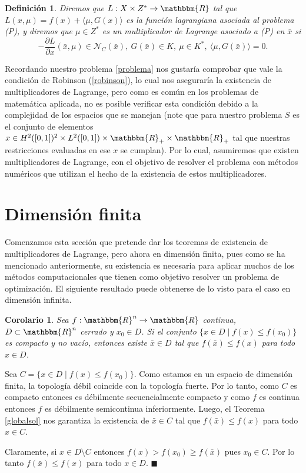 \documentclass[a4paper,10pt]{book}
\newcommand{\R}{\mathbbm{R}}
\newcommand{\arr}{\rightarrow}
\newcommand{\bx}{\bar{x}}
\newcommand{\cN}{\mathcal{N}}
\newtheorem{cor}[teo]{Corolario}
\newtheorem{defi}[teo]{Definici\'on}
\newenvironment{dem}{\vspace*{-0.1cm}{\it Demostraci\'on:}}{\hfill
$\blacksquare$\\}
\begin{document}
\begin{defi}
 Diremos que $L:X\times Z^*\arr \R$ tal que $L(x,\mu)= f(x)+\langle\mu , G(x)\rangle$ es la función lagrangiana asociada al problema (P), y diremos que $\mu\in Z^*$ es un multiplicador de Lagrange asociado a (P) en $\bx$ si 
 $$-\frac{\partial L}{\partial x}(\bx,\mu)\in\cN_C(\bx),\ G(\bx)\in K,\ \mu\in K^* ,\  \langle\mu , G(\bx)\rangle=0.$$ 
\end{defi}

Recordando nuestro problema \eqref{problema} nos gustaría comprobar que vale la condición de Robinson (\ref{robinson}), lo cual nos aseguraría la existencia de multiplicadores de Lagrange, pero como es común en los problemas de matemática aplicada, no es posible verificar esta condición debido a la complejidad de los espacios que se manejan (note que para nuestro problema $S$ es el conjunto de elementos $x\in H^2([0,1])^2 \times L^2([0,1])\times \R_+\times \R_+$ tal que nuestras restricciones evaluadas en ese $x$ se cumplan). Por lo cual, asumiremos que existen multiplicadores de Lagrange, con el objetivo de resolver el problema con métodos numéricos que utilizan el hecho de la existencia de estos multiplicadores.

\section{Dimensión finita}

Comenzamos esta sección que pretende dar los teoremas de existencia de multiplicadores de Lagrange, pero ahora en dimensión finita, pues como se ha mencionado anteriormente, su existencia es necesaria para aplicar muchos de los métodos computacionales que tienen como objetivo resolver un problema de optimización. El siguiente resultado puede obtenerse de lo visto para el caso en dimensión infinita.

\begin{cor}\label{solglobalfinita}
 Sea $f:\R^n\to\R$ continua, $D\subset\R^n$ cerrado y $x_0\in D$. Si el conjunto $\{x\in D \mid f(x)\leq f(x_0)\}$ es compacto y no vacío, entonces existe $\bar{x}\in D$ tal que $f(\bar{x})\leq f(x)$ para todo $x\in D$.
\end{cor}
\begin{dem}
 Sea $C=\{x\in D \mid f(x)\leq f(x_0)\}$. Como estamos en un espacio de dimensión finita, la topología débil coincide con la topología fuerte. Por lo tanto, como $C$ es compacto entonces es débilmente secuencialmente compacto y como $f$ es continua entonces $f$ es débilmente semicontinua inferiormente. Luego, el Teorema \ref{globalsol} nos garantiza la existencia de $\bx\in C$ tal que $f(\bx)\leq f(x)$ para todo $x\in C$.
 
 Claramente, si $x\in D\setminus C$ entonces $f(x)>f(x_0)\geq f(\bx)$ pues $x_0\in C$. Por lo tanto $f(\bx)\leq f(x)$ para todo $x\in D$.
\end{dem}
\end{document}
